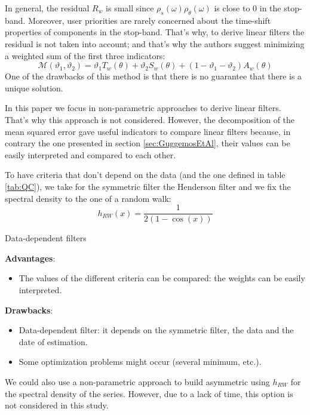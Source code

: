\documentclass[
  12pt,
  ,
  a4paper]{article}
\providecommand{\tightlist}{%
  \setlength{\itemsep}{0pt}\setlength{\parskip}{0pt}}
\newcommand\1{\mathds{1}}
\begin{document}
In general, the residual \(R_w\) is small since \(\rho_s(\omega)\rho_\theta(\omega)\) is close to 0 in the stop-band.
Moreover, user priorities are rarely concerned about the time-shift properties of components in the stop-band.
That's why, to derive linear filters the residual is not taken into account; and that's why the authors suggest minimizing a weighted sum of the first three indicators:
\[
\mathcal{M}(\vartheta_{1},\vartheta_{2})=\vartheta_{1}T_w(\theta)+\vartheta_{2}S_w(\theta)+(1-\vartheta_{1}-\vartheta_{2})A_w(\theta)
\]
One of the drawbacks of this method is that there is no guarantee that there is a unique solution.

In this paper we focus in non-parametric approaches to derive linear filters.
That's why this approach is not considered.
However, the decomposition of the mean squared error gave useful indicators to compare linear filters because, in contrary the one presented in section \ref{sec:GuggemosEtAl}, their values can be easily interpreted and compared to each other.

To have criteria that don't depend on the data (and the one defined in table \ref{tab:QC}), we take for the symmetric filter the Henderson filter and we fix the spectral density to the one of a random walk:
\[
h_{RW}(x)=\frac{1}{2(1-\cos(x))}
\]

\begin{summary}{Data-dependent filters}

\textbf{Advantages}:

\begin{itemize}
\tightlist
\item
  The values of the different criteria can be compared: the weights can be easily interpreted.
\end{itemize}

\textbf{Drawbacks}:

\begin{itemize}
\item
  Data-dependent filter: it depends on the symmetric filter, the data and the date of estimation.
\item
  Some optimization problems might occur (several minimum, etc.).
\end{itemize}

\end{summary}

We could also use a non-parametric approach to build asymmetric using \(h_{RW}\) for the spectral density of the series.
However, due to a lack of time, this option is not considered in this study.
\end{document}
